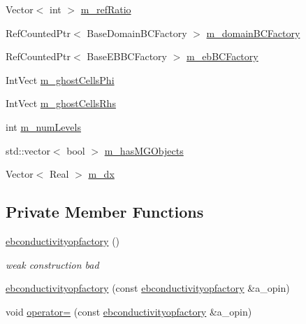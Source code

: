 \begin{DoxyCompactItemize}
\item 
Vector$<$ int $>$ \hyperlink{classebconductivityopfactory_a0de01e8b37fa846cbdc45d5caa923438}{m\+\_\+ref\+Ratio}
\item 
Ref\+Counted\+Ptr$<$ Base\+Domain\+B\+C\+Factory $>$ \hyperlink{classebconductivityopfactory_a56a9491fa97b715ae7ade7d01e20cf25}{m\+\_\+domain\+B\+C\+Factory}
\item 
Ref\+Counted\+Ptr$<$ Base\+E\+B\+B\+C\+Factory $>$ \hyperlink{classebconductivityopfactory_aba737252beaa8db65a305ecf7b11ec75}{m\+\_\+eb\+B\+C\+Factory}
\item 
Int\+Vect \hyperlink{classebconductivityopfactory_a1d2e588bf687d5ba9baf9f093b7c519d}{m\+\_\+ghost\+Cells\+Phi}
\item 
Int\+Vect \hyperlink{classebconductivityopfactory_ad37221eae09485be07cc91246559ee22}{m\+\_\+ghost\+Cells\+Rhs}
\item 
int \hyperlink{classebconductivityopfactory_ac09d05c802f2612ef917c83290baa331}{m\+\_\+num\+Levels}
\item 
std\+::vector$<$ bool $>$ \hyperlink{classebconductivityopfactory_a237047b2d5f2b0cd5e48578ff13f1b85}{m\+\_\+has\+M\+G\+Objects}
\item 
Vector$<$ Real $>$ \hyperlink{classebconductivityopfactory_ace1375add529e30e75d78dc6436dbf94}{m\+\_\+dx}
\end{DoxyCompactItemize}
\subsection*{Private Member Functions}
\begin{DoxyCompactItemize}
\item 
\hyperlink{classebconductivityopfactory_a71ff5b1871c7784f5d2727c9df0ab26f}{ebconductivityopfactory} ()
\begin{DoxyCompactList}\small\item\em weak construction bad \end{DoxyCompactList}\item 
\hyperlink{classebconductivityopfactory_a63ea98a0f1b12f87c67de409666d4851}{ebconductivityopfactory} (const \hyperlink{classebconductivityopfactory}{ebconductivityopfactory} \&a\+\_\+opin)
\item 
void \hyperlink{classebconductivityopfactory_a2bced74da1143015dd13dccc586f8df7}{operator=} (const \hyperlink{classebconductivityopfactory}{ebconductivityopfactory} \&a\+\_\+opin)
\end{DoxyCompactItemize}


